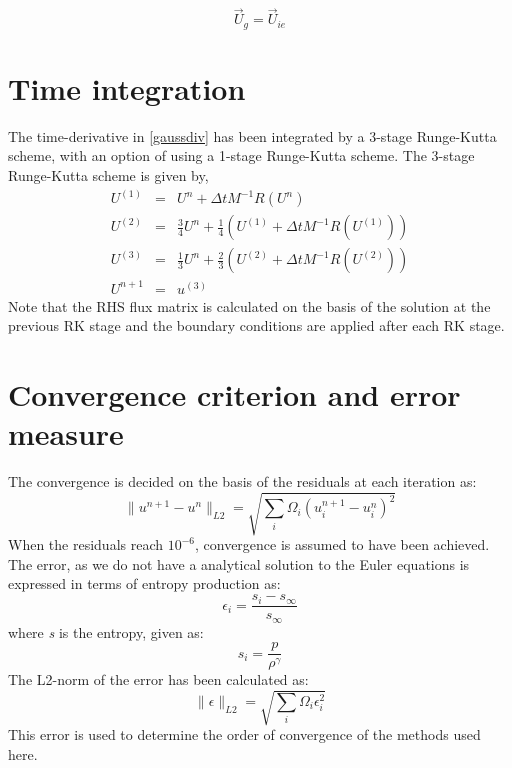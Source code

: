 \documentclass[12pt]{elsarticle}
\begin{document}
	\begin{equation}
		\overrightarrow{U}_g=\overrightarrow{U}_{ie}
	\end{equation}
	
	
	\section{Time integration}
	The time-derivative in \ref{gaussdiv} has been integrated by a 3-stage Runge-Kutta scheme, with an option of using a 1-stage Runge-Kutta scheme. The 3-stage Runge-Kutta scheme is given by,
	\begin{equation}
		\begin{array}{lcl}
			U^{(1)} & = & U^n + \Delta t M^{-1}R(U^n)\\
			U^{(2)} & = & \frac{3}{4} U^n + \frac{1}{4}(U^{(1)} + \Delta t M^{-1}R(U^{(1)}))\\
			U^{(3)} & = & \frac{1}{3} U^n + \frac{2}{3}(U^{(2)} + \Delta t M^{-1}R(U^{(2)}))\\
			U^{n+1} & = & u^{(3)}
		\end{array}
	\end{equation}
	Note that the RHS flux matrix is calculated on the basis of the solution at the previous RK stage and the boundary conditions are applied after each RK stage.
	
	\section{Convergence criterion and error measure}
	The convergence is decided on the basis of the residuals at each iteration as:
	\begin{equation}
		\parallel u^{n+1}-u^n \parallel _{L2} = \sqrt{\sum _i \Omega_i (u_i^{n+1}-u_i^{n})^2}
	\end{equation}
	When the residuals reach $10^{-6}$, convergence is assumed to have been achieved.
	The error, as we do not have a analytical solution to the Euler equations is expressed in terms of entropy production as:
	\begin{equation}
		\epsilon_i = \frac{s_i - s_\infty}{s_\infty}
	\end{equation}
	where \textit{s} is the entropy, given as:
	\begin{equation}
		s_i = \frac{p}{\rho ^ \gamma}
	\end{equation}
	The L2-norm of the error has been calculated as:
	\begin{equation}\label{eq:l2err}
		\parallel \epsilon \parallel _{L2} = \sqrt{\sum _i \Omega_i \epsilon_i ^2}
	\end{equation}
	This error is used to determine the order of convergence of the methods used here.
	
\end{document}
